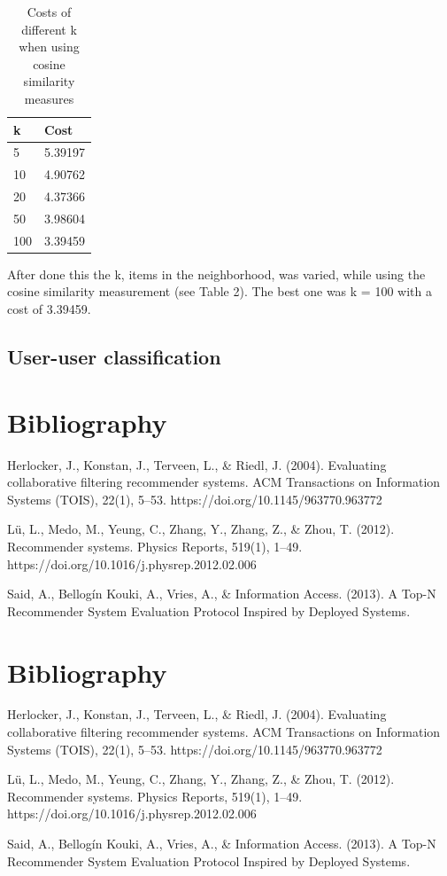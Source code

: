 \documentclass[11pt]{article}
\begin{document}
\begin{table}[]
\begin{tabular}{@{}ll@{}}
\toprule
k   & Cost    \\ \midrule
5   & 5.39197 \\
10  & 4.90762 \\
20  & 4.37366 \\
50  & 3.98604 \\
100 & 3.39459 \\ \bottomrule
\end{tabular}
\caption{Costs of different k when using cosine similarity measures}
\end{table}

After done this the k, items in the neighborhood, was varied, while using the cosine similarity measurement (see Table 2). The best one was k = 100 with a cost of 3.39459.

\subsection{User-user classification}

\section{Bibliography}
Herlocker, J., Konstan, J., Terveen, L., & Riedl, J. (2004). Evaluating collaborative filtering recommender systems. ACM Transactions on Information Systems (TOIS), 22(1), 5–53. https://doi.org/10.1145/963770.963772

Lü, L., Medo, M., Yeung, C., Zhang, Y., Zhang, Z., & Zhou, T. (2012). Recommender systems. Physics Reports, 519(1), 1–49. https://doi.org/10.1016/j.physrep.2012.02.006

Said, A., Bellogín Kouki, A., Vries, A., & Information Access. (2013). A Top-N Recommender System Evaluation Protocol Inspired by Deployed Systems.
\section{Bibliography}
Herlocker, J., Konstan, J., Terveen, L., & Riedl, J. (2004). Evaluating collaborative filtering recommender systems. ACM Transactions on Information Systems (TOIS), 22(1), 5–53. https://doi.org/10.1145/963770.963772

Lü, L., Medo, M., Yeung, C., Zhang, Y., Zhang, Z., & Zhou, T. (2012). Recommender systems. Physics Reports, 519(1), 1–49. https://doi.org/10.1016/j.physrep.2012.02.006

Said, A., Bellogín Kouki, A., Vries, A., & Information Access. (2013). A Top-N Recommender System Evaluation Protocol Inspired by Deployed Systems.
\end{document}
